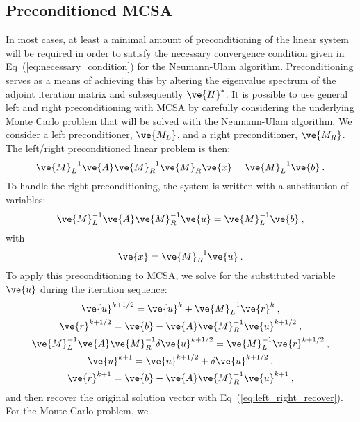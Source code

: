 \documentclass[letterpaper,11pt]{article}
\begin{document}
\subsection{Preconditioned MCSA}
\label{subsec:preconditioning}
In most cases, at least a minimal amount of preconditioning of the
linear system will be required in order to satisfy the necessary
convergence condition given in Eq~(\ref{eq:necessary_condition}) for
the Neumann-Ulam algorithm. Preconditioning serves as a means of
achieving this by altering the eigenvalue spectrum of the adjoint
iteration matrix and subsequently $\ve{H}^*$. It is possible to use
general left and right preconditioning with MCSA by carefully
considering the underlying Monte Carlo problem that will be solved
with the Neumann-Ulam algorithm. We consider a left preconditioner,
$\ve{M_L}$, and a right preconditioner, $\ve{M_R}$. The left/right
preconditioned linear problem is then:
\begin{equation}
  \ve{M}_L^{-1}\ve{A}\ve{M}_R^{-1}\ve{M}_R\ve{x} = \ve{M}_L^{-1}\ve{b}\:.
  \label{eq:left_right_linear_problem}
\end{equation}
To handle the right preconditioning, the system is written with a
substitution of variables:
\begin{equation}
  \ve{M}_L^{-1}\ve{A}\ve{M}_R^{-1}\ve{u} = \ve{M}_L^{-1}\ve{b}\:,
  \label{eq:left_right_subs_problem}
\end{equation}
with
\begin{equation}
  \ve{x} = \ve{M}_R^{-1}\ve{u}\:.
  \label{eq:left_right_recover}
\end{equation}
To apply this preconditioning to MCSA, we solve for the substituted
variable $\ve{u}$ during the iteration sequence:
\begin{subequations}
  \begin{gather}
    \ve{u}^{k+1/2} = \ve{u}^k + \ve{M}_L^{-1}\ve{r}^k\:,\\
    \ve{r}^{k+1/2} = \ve{b}-\ve{A}\ve{M}_R^{-1}\ve{u}^{k+1/2}\:,\\ 
    \ve{M}_L^{-1}\ve{A}\ve{M}_R^{-1}\delta\ve{u}^{k+1/2} = \ve{M}_L^{-1}\ve{r}^{k+1/2}\:,\\ 
    \ve{u}^{k+1} = \ve{u}^{k+1/2} + \delta \ve{u}^{k+1/2}\:,\\
    \ve{r}^{k+1} = \ve{b}-\ve{A}\ve{M}_R^{-1}\ve{u}^{k+1}\:,
  \end{gather}
  \label{eq:left_right_mcsa}
\end{subequations}
and then recover the original solution vector with
Eq~(\ref{eq:left_right_recover}). For the Monte Carlo problem, we
\end{document}
